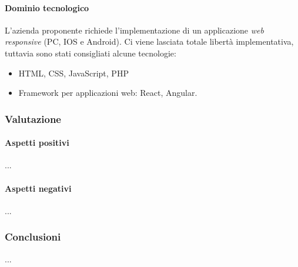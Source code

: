 \documentclass[italian,12pt]{article} %
\begin{document}
\paragraph{Dominio tecnologico}
L'azienda proponente richiede l'implementazione di un applicazione \textit{web responsive} (PC, IOS e Android).
Ci viene lasciata totale libertà implementativa, tuttavia sono stati consigliati alcune tecnologie:
\begin{itemize}
	\item HTML, CSS, JavaScript, PHP
    \item Framework per applicazioni web: React, Angular.
\end{itemize}

\subsubsection{Valutazione}
\paragraph{Aspetti positivi}
...
\paragraph{Aspetti negativi}
...

\subsubsection{Conclusioni}
...
\end{document}
